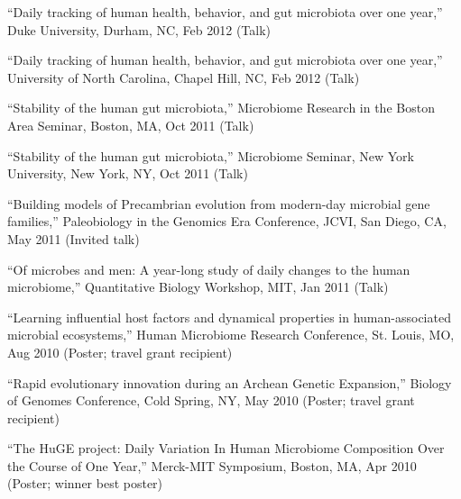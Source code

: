 \documentclass[overlapped,line,11pt]{res}
\begin{document}
\begin{resume}
\begin{revnumerate}[28]
\item {``Daily tracking of human health, behavior, and gut microbiota
  over one year,'' Duke University, Durham, NC, Feb 2012 (Talk)}
\vspace*{0mm}

\item {``Daily tracking of human health, behavior, and gut microbiota
  over one year,'' University of North Carolina, Chapel Hill, NC, Feb 2012 (Talk)}
\vspace*{0mm}

\item {``Stability of the human gut microbiota,'' Microbiome Research
  in the Boston Area Seminar, Boston, MA, Oct 2011 (Talk)}
\vspace*{0mm}

\item {``Stability of the human gut microbiota,'' Microbiome Seminar,
  New York University, New York, NY, Oct 2011 (Talk)}
\vspace*{0mm}

\item {``Building models of Precambrian evolution from modern-day
  microbial gene families,'' Paleobiology in the Genomics Era
  Conference, JCVI, San Diego, CA, May 2011 (Invited talk)}
\vspace*{0mm}

\item {``Of microbes and men:
A year-long study of daily changes to the human microbiome,''
Quantitative Biology Workshop, MIT, Jan 2011 (Talk)}
\vspace*{0mm}

\item {``Learning influential host factors and dynamical properties in
human-associated microbial ecosystems,'' Human Microbiome Research
Conference, St. Louis, MO, Aug 2010 (Poster; travel grant recipient)}
\vspace*{0mm}

\item {``Rapid evolutionary innovation during an Archean Genetic
  Expansion,'' Biology of Genomes Conference, Cold Spring, NY,
  May 2010 (Poster; travel grant recipient)}
\vspace*{0mm}


\item {``The HuGE project: Daily Variation In Human Microbiome
Composition Over the Course of One Year,'' Merck-MIT Symposium,
Boston, MA, Apr 2010 (Poster; winner best poster)}
\vspace*{0mm}



\end{revnumerate}
\end{resume}
\end{document}
